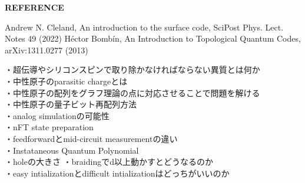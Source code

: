 \documentclass[a4paper,10.5pt]{ltjsarticle}
\begin{document}
{\Large \bfseries REFERENCE}
\begin{thebibliography}{1}
\vspace{-1.5cm}
   Andrew N. Cleland, An introduction to the surface code, SciPost Phys. Lect. Notes 49 (2022)
   Héctor Bombín, An Introduction to Topological Quantum Codes, arXiv:1311.0277 (2013)
\end{thebibliography}
\vspace{50pt}
・超伝導やシリコンスピンで取り除かなければならない異質とは何か\\
・中性原子のparasitic chargeとは\\
・中性原子の配列をグラフ理論の点に対応させることで問題を解ける\\
・中性原子の量子ビット再配列方法\\
・analog simulationの可能性\\
・nFT state preparation\\
・feedforwardとmid-circuit measurementの違い\\
・Instataneous Quantum Polynomial\\
・holeの大きさ
・braidingでd以上動かすとどうなるのか\\
・easy intializationとdifficult intializationはどっちがいいのか\\
\end{document}
